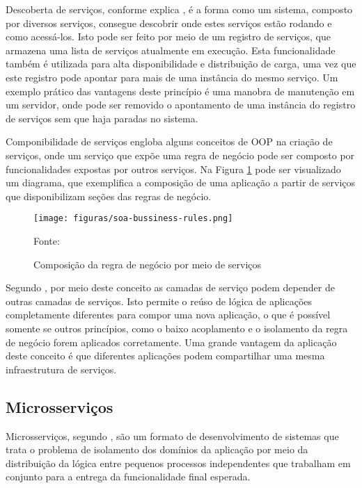Descoberta de serviços, conforme explica , é a
forma como um sistema, composto por diversos serviços, consegue descobrir onde
estes serviços estão rodando e como acessá-los. Isto pode ser feito por
meio de um registro de serviços, que armazena uma lista de serviços
atualmente em execução. Esta funcionalidade também é utilizada para alta
disponibilidade e distribuição de carga, uma vez que este registro pode
apontar para mais de uma instância do mesmo serviço. Um exemplo prático das
vantagens deste princípio é uma manobra de manutenção em um servidor, onde
pode ser removido o apontamento de uma instância do registro de serviços sem
que haja paradas no sistema.

Componibilidade de serviços engloba alguns conceitos de \ac{OOP} na criação
de serviços, onde um serviço que expõe uma regra de negócio pode ser composto
por funcionalidades expostas por outros serviços. Na Figura
\ref{fig:soa-bussiness-rules} pode ser visualizado um diagrama, que exemplifica
a composição de uma aplicação a partir de serviços que disponibilizam seções
das regras de negócio.

\begin{figure}[H]
	\centering
	\caption{Composição da regra de negócio por meio de serviços}
	\texttt{[image: figuras/soa-bussiness-rules.png]}

	\label{fig:soa-bussiness-rules}
	\footnotesize Fonte: 
\end{figure}

Segundo , por meio deste conceito as camadas de serviço
podem depender de outras camadas de serviços. Isto permite o reúso de lógica
de aplicações completamente diferentes para compor uma nova aplicação, o que
é possível somente se outros princípios, como o baixo acoplamento e o
isolamento da regra de negócio forem aplicados corretamente. Uma grande
vantagem da aplicação deste conceito é que diferentes aplicações podem
compartilhar uma mesma infraestrutura de serviços.

\subsection{Microsserviços}

Microsserviços, segundo , são um formato de
desenvolvimento de sistemas que trata o problema de isolamento dos domínios
da aplicação por meio da distribuição da lógica entre pequenos processos
independentes que trabalham em conjunto para a entrega da funcionalidade
final esperada.

